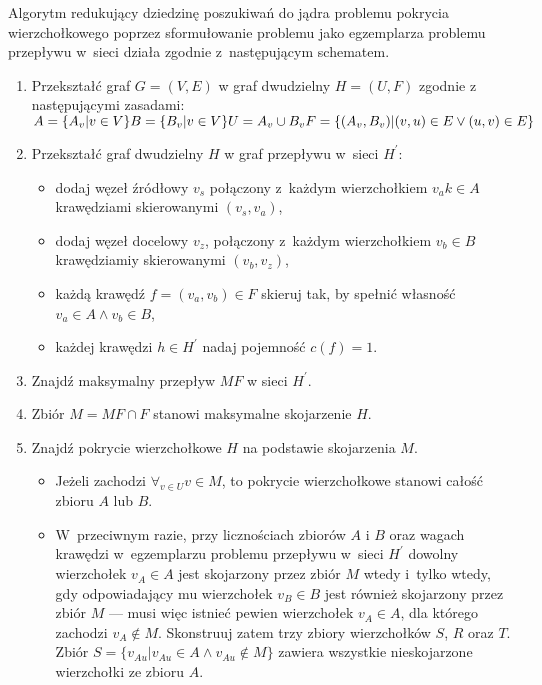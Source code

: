 Algorytm redukujący dziedzinę poszukiwań do jądra problemu pokrycia wierzchołkowego poprzez sformułowanie problemu jako egzemplarza problemu przepływu w~sieci działa zgodnie z~następującym schematem.
\begin{enumerate}
  \item Przekształć graf $G=(V,E)$ w graf dwudzielny $H=(U,F)$ zgodnie z
    następującymi zasadami:\\
    $A=\{A_v|v \in V\}\\
    B=\{B_v|v \in V\}\\
    U=A_v \cup B_v
    F=\{(A_v, B_v)|(v,u) \in E \lor (u,v) \in E\}$
  \item Przekształć graf dwudzielny $H$ w graf przepływu w~sieci $H^\prime$:
    \begin{itemize}
      \item dodaj węzeł źródłowy $v_s$ połączony z~każdym wierzchołkiem $v_a
        k\in A$ krawędziami skierowanymi $(v_s, v_a)$,
      \item dodaj węzeł docelowy $v_z$, połączony z~każdym wierzchołkiem $v_b
        \in B$ krawędziamiy skierowanymi $(v_b, v_z)$,
      \item każdą krawędź $f=(v_a, v_b) \in F$ skieruj tak, by spełnić własność $v_a \in A \land v_b \in B$,
      \item każdej krawędzi $h \in H^\prime$ nadaj pojemność $c(f)=1$.
    \end{itemize}
  \item Znajdź maksymalny przepływ $MF$ w sieci $H^\prime$.
  \item Zbiór $M=MF \cap F$ stanowi maksymalne skojarzenie $H$.
  \item Znajdź pokrycie wierzchołkowe $H$ na podstawie skojarzenia $M$.
    \begin{itemize}
      \item Jeżeli zachodzi $\forall_{v \in U}{v \in M}$, to pokrycie wierzchołkowe stanowi całość zbioru $A$ lub $B$.
      \item W~przeciwnym razie, przy licznościach zbiorów $A$ i $B$ oraz wagach krawędzi w~egzemplarzu problemu przepływu w~sieci $H^\prime$ dowolny wierzchołek $v_A \in A$ jest skojarzony przez zbiór $M$ wtedy i~tylko wtedy, gdy odpowiadający mu wierzchołek $v_B \in B$ jest również skojarzony przez zbiór $M$ --- musi więc istnieć pewien wierzchołek $v_A \in A$, dla którego zachodzi $v_A \notin M$.
        Skonstruuj zatem trzy zbiory wierzchołków $S$, $R$ oraz $T$.
        Zbiór $S = \{v_{Au}|v_{Au} \in A \land v_{Au} \notin M\}$ zawiera wszystkie nieskojarzone wierzchołki ze zbioru $A$.

\end{itemize}
\end{enumerate}
